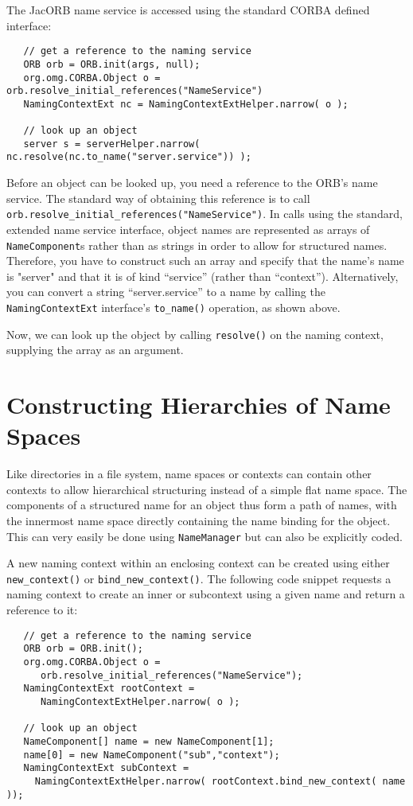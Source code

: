 \documentclass[12pt]{scrbook}
\begin{document}
The  JacORB name  service is accessed using  the standard  CORBA
defined  interface:

\small{
\begin{verbatim}
   // get a reference to the naming service
   ORB orb = ORB.init(args, null);
   org.omg.CORBA.Object o = orb.resolve_initial_references("NameService")
   NamingContextExt nc = NamingContextExtHelper.narrow( o );

   // look up an object 
   server s = serverHelper.narrow( nc.resolve(nc.to_name("server.service")) );
\end{verbatim}
}

Before an object  can be looked up, you need a  reference to the ORB's
name service. The standard way  of obtaining this reference is to call
{\tt orb.resolve\_initial\_\-referen\-ces("Name\-Service")}.  In calls using
the  standard,  extended  name  service interface,  object  names  are
represented as  arrays of {\tt NameComponent}s rather  than as strings
in  order to  allow  for  structured names.   Therefore,  you have  to
construct such an  array and specify that the  name's name is "server"
and    that    it    is    of   kind    ``service''    (rather    than
``context'').    Alternatively,    you    can   convert    a    string
``server.service''  to a  name by  calling the  {\tt NamingContextExt}
interface's {\tt to\_name()} operation, as shown above.

Now,  we can  look up  the object  by calling  {\tt resolve()}  on the
naming context, supplying the array as an argument.

\section{Constructing Hierarchies of Name Spaces}

Like directories in a file system, name spaces or contexts can contain
other contexts  to allow hierarchical structuring instead  of a simple
flat name  space. The  components of a  structured name for  an object
thus  form a path  of names,  with the  innermost name  space directly
containing the  name binding for the  object. This can  very easily be
done using {\tt NameManager} but can also be explicitly coded.

A new naming context within  an enclosing context can be created using
either   {\tt  new\_context()}   or  {\tt   bind\_new\_context()}.  The
following code snippet requests a naming context to create an inner or
subcontext using a given name and return a reference to it:
\small{\begin{verbatim}
   // get a reference to the naming service
   ORB orb = ORB.init();
   org.omg.CORBA.Object o = 
      orb.resolve_initial_references("NameService");
   NamingContextExt rootContext = 
      NamingContextExtHelper.narrow( o );

   // look up an object 
   NameComponent[] name = new NameComponent[1];
   name[0] = new NameComponent("sub","context");
   NamingContextExt subContext = 
     NamingContextExtHelper.narrow( rootContext.bind_new_context( name ));
\end{verbatim}}
\end{document}
